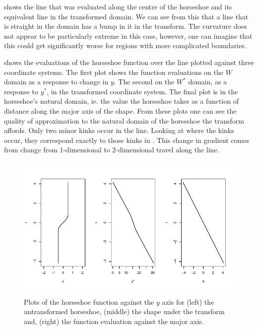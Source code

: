  shows the line that was evaluated along the centre of the horseshoe and its equivalent line in the transformed domain. We can see from this that a line that is straight in the domain has a bump in it in the transform. The curvature does not appear to be particularly extreme in this case, however, one can imagine that this could get significantly worse for regions with more complicated boundaries.

 shows the evaluations of the horseshoe function over the line plotted against three coordinate systems. The first plot shows the function evaluations on the $W$ domain as a response to change in $y$. The second on the $W^*$ domain, as a response to $y^*$, in the transformed coordinate system. The final plot is in the horseshoe's natural domain, ie. the value the horseshoe takes as a function of distance along the major axis of the shape. From these plots one can see the quality of approximation to the natural domain of the horseshoe the \sch transform affords. Only two minor kinks occur in the line. Looking at where the kinks occur, they correspond exactly to those kinks in . This change in gradient comes from change from 1-dimensional to 2-dimensional travel along the line.

\begin{figure}
\centering
\includegraphics[trim=0in 0in 0in 0in]{sc/figs/centrelinelineplots.pdf} \\
\caption{Plots of the horseshoe function against the $y$ axis for (left) the untransformed horseshoe, (middle) the shape under the \sch transform and, (right) the function evaluation against the major axis.}
\label{centrelinelineplot}
\end{figure}


